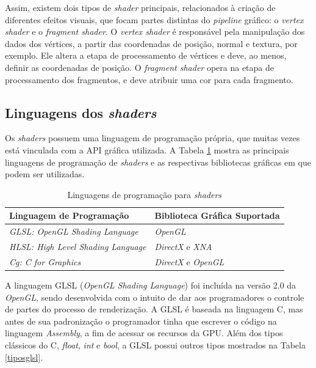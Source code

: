 	 Assim, existem dois tipos de \textit{shader} principais, relacionados à criação de diferentes efeitos visuais, que focam partes distintas do \textit{pipeline} gráfico: o \textit{vertex shader} e o \textit{fragment shader}. O \textit{vertex shader} é responsável pela manipulação dos dados dos vértices, a partir das coordenadas de posição, normal e textura, por exemplo. Ele altera a etapa de processamento de vértices e deve, ao menos, definir as coordenadas de posição.  O \textit{fragment shader} opera na etapa de processamento dos fragmentos, e deve atribuir uma cor para cada fragmento.

\subsection{Linguagens dos \textit{shaders}}

	
	Os \textit{shaders} possuem uma linguagem de programação própria, que muitas vezes está vinculada com a API gráfica utilizada.  A Tabela \ref{lingshader} mostra as principais linguagens de programação de \textit{shaders} e as respectivas bibliotecas gráficas em que podem ser utilizadas. 

	\begin{table}[ht]
	\centering	
	\begin{tabularx}{0.9\textwidth}{lX}
		\toprule
		\textbf{Linguagem de Programação} & \textbf{Biblioteca Gráfica Suportada}  \\
		\midrule
		\textit{GLSL: OpenGL Shading Language} & \textit{OpenGL} \\
		\textit{HLSL: High Level Shading Language} & \textit{DirectX} e \textit{XNA} \\
		\textit{Cg: C for Graphics} & \textit{DirectX} e \textit{OpenGL}\\
		\bottomrule
	\end{tabularx}
	\caption{ Linguagens de programação para \textit{shaders}}
	\label{lingshader}
\end{table}

	A linguagem GLSL (\textit{OpenGL Shading Language}) foi incluída na versão 2.0 da  \textit{OpenGL}, sendo desenvolvida com o intuito de dar aos programadores o controle de partes do processo de renderização. A GLSL é baseada na linguagem C, mas antes de sua padronização o programador tinha que escrever o código na linguagem \textit{Assembly}, a fim de acessar os recursos da GPU. Além dos tipos clássicos do C, \textit{float}, \textit{int} e \textit{bool}, a GLSL possui outros tipos mostrados na Tabela \ref{tiposglsl}.


